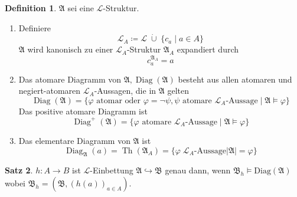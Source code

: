 \documentclass[12pt,parskip=full]{scrartcl}
\newcommand{\abs}[1]{{\left| #1 \right|}}
\theoremstyle{definition}
\newtheorem{theorem}{Satz}[section]
\newtheorem{definition}[theorem]{Definition}
\begin{document}
	\begin{definition}
		$\mathfrak{A}$ sei eine $\mathcal{L}$-Struktur.
		\begin{enumerate}
			\item Definiere
			\begin{equation*}
				\mathcal{L}_A \coloneqq \mathcal{L} \;\dot{\cup}\; \{ c_a \mid a \in A \}
			\end{equation*}
			$\mathfrak{A}$ wird kanonisch zu einer $\mathcal{L}_A$-Struktur $\mathfrak{A}_A$ expandiert durch
			\begin{equation*}
				c_a^{\mathfrak{A}_A} = a
			\end{equation*}
			\item Das atomare Diagramm von $\mathfrak{A}, \operatorname{Diag}(\mathfrak{A})$ besteht aus allen atomaren und negiert-atomaren $\mathcal{L}_A$-Aussagen, die in $\mathfrak{A}$ gelten
			\begin{equation*}
				\operatorname{Diag}(\mathfrak{A}) = \{ \text{$\varphi$ atomar oder $\varphi = \lnot \psi, \psi$ atomare $\mathcal{L}_A$-Aussage} \mid \mathfrak{A} \models \varphi \}
			\end{equation*}
			Das positive atomare Diagramm ist
			\begin{equation*}
				\operatorname{Diag}^+(\mathfrak{A}) = \{ \text{$\varphi$ atomare $\mathcal{L}_A$-Aussage} \mid \mathfrak{A} \models \varphi \}
			\end{equation*}
			\item Das elementare Diagramm von $\mathfrak{A}$ ist
			\begin{equation*}
				\operatorname{Diag}_\mathfrak{A}(a) = \operatorname{Th}(\mathfrak{A}_A) = \{ \varphi \; \mathcal{L}_A\text{-Aussage} \abs{\mathfrak{A}} = \varphi \}
			\end{equation*}
		\end{enumerate}
	\end{definition}

	\begin{theorem}
		$h: A \to B$ ist $\mathcal{L}$-Einbettung $\mathfrak{A} \hookrightarrow \mathfrak{B}$ genau dann, wenn $\mathfrak{B}_h \models \operatorname{Diag(\mathfrak{A})}$ wobei $\mathfrak{B}_h = \left(\mathfrak{B}, (h(a))_{a \in A} \right)$.
	\end{theorem}
\end{document}
